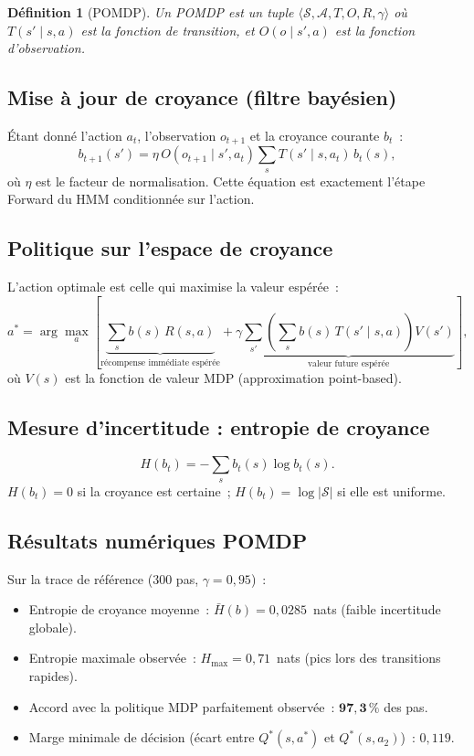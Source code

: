 \documentclass[12pt,a4paper]{article}
\newtheorem{definition}{Définition}
\begin{document}
\begin{definition}[POMDP]
Un POMDP est un tuple $\langle \mathcal{S}, \mathcal{A}, T, O, R, \gamma \rangle$
où $T(s'\mid s,a)$ est la fonction de transition, et $O(o\mid s',a)$ est la fonction
d'observation.
\end{definition}

\subsection{Mise à jour de croyance (filtre bayésien)}

Étant donné l'action $a_t$, l'observation $o_{t+1}$ et la croyance courante $b_t$~:
\[
b_{t+1}(s') = \eta\, O(o_{t+1}\mid s', a_t)\sum_s T(s'\mid s, a_t)\,b_t(s),
\]
où $\eta$ est le facteur de normalisation.
Cette équation est exactement l'étape Forward du HMM conditionnée sur l'action.

\subsection{Politique sur l'espace de croyance}

L'action optimale est celle qui maximise la valeur espérée~:
\[
a^* = \arg\max_a \left[
  \underbrace{\sum_s b(s)\,R(s,a)}_{\text{récompense immédiate espérée}}
  + \gamma \underbrace{\sum_{s'}\left(\sum_s b(s)\,T(s'\mid s,a)\right)V(s')}_{\text{valeur future espérée}}
\right],
\]
où $V(s)$ est la fonction de valeur MDP (approximation point-based).

\subsection{Mesure d'incertitude : entropie de croyance}

\[
H(b_t) = -\sum_s b_t(s)\log b_t(s).
\]
$H(b_t) = 0$ si la croyance est certaine~; $H(b_t) = \log|\mathcal{S}|$ si elle est uniforme.

\subsection{Résultats numériques POMDP}

Sur la trace de référence (300 pas, $\gamma = 0{,}95$)~:
\begin{itemize}
  \item Entropie de croyance moyenne~: $\bar{H}(b) = 0{,}0285$~nats (faible incertitude globale).
  \item Entropie maximale observée~: $H_{\max} = 0{,}71$~nats (pics lors des transitions rapides).
  \item Accord avec la politique MDP parfaitement observée~: $\mathbf{97{,}3\,\%}$ des pas.
  \item Marge minimale de décision (écart entre $Q^*(s, a^*)$ et $Q^*(s, a_2)$)~: $0{,}119$.
\end{itemize}
\end{document}
